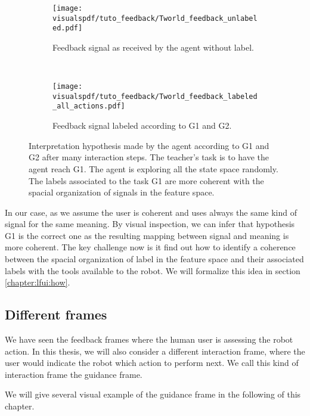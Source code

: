\begin{figure}[!htbp]
    \centering
    \begin{subfigure}[t]{\tworldsize\columnwidth}
        \centering
        \texttt{[image: \\visualspdf/tuto\_feedback/Tworld\_feedback\_unlabeled.pdf]}
        \caption{Feedback signal as received by the agent without label.}
    \end{subfigure}\\
    \begin{subfigure}[b]{\columnwidth}
        \centering
        \texttt{[image: \\visualspdf/tuto\_feedback/Tworld\_feedback\_labeled\_all\_actions.pdf]}
        \caption{Feedback signal labeled according to G1 and G2.}
        \label{fig:TworldLabelinterpretation}
    \end{subfigure}
    \caption{Interpretation hypothesis made by the agent according to G1 and G2 after many interaction steps. The teacher's task is to have the agent reach G1. The agent is exploring all the state space randomly. The labels associated to the task G1 are more coherent with the spacial organization of signals in the feature space.}
    \label{fig:TworldLabel}
\end{figure}

In our case, as we assume the user is coherent and uses always the same kind of signal for the same meaning. By visual inspection, we can infer that hypothesis G1 is the correct one as the resulting mapping between signal and meaning is more coherent. The key challenge now is it find out how to identify a coherence between the spacial organization of label in the feature space and their associated labels with the tools available to the robot. We will formalize this idea in section \ref{chapter:lfui:how}. 

\subsection{Different frames}

We have seen the feedback frames where the human user is assessing the robot action. In this thesis, we will also consider a different interaction frame, where the user would indicate the robot which action to perform next. We call this kind of interaction frame the guidance frame.

We will give several visual example of the guidance frame in the following of this chapter.



